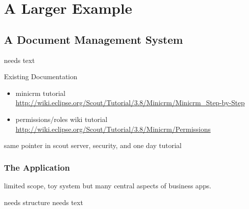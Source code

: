 \documentclass[a4paper,10pt,twoside]{book}
\begin{document}
  \sloppy
\fi

\chapter{A Larger Example}

\section{A Document Management System}
needs text

\noindent Existing Documentation
\begin{itemize}
  \item minicrm tutorial \url{http://wiki.eclipse.org/Scout/Tutorial/3.8/Minicrm/Minicrm_Step-by-Step}
  \item permissions/roles wiki tutorial \url{http://wiki.eclipse.org/Scout/Tutorial/3.8/Minicrm/Permissions}
\end{itemize}

same pointer in scout server, security, and one day tutorial

\subsection{The Application}
limited scope, toy system but many central aspects of business apps. 

needs structure 
needs text

\ifx\wholebook\relax\else
   
   
\end{document}
